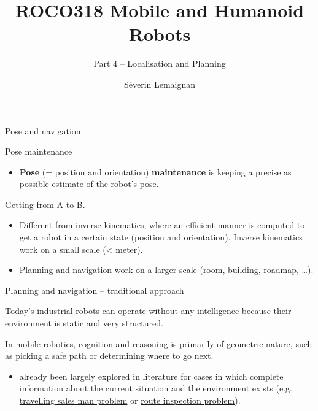 \documentclass[compress]{beamer}
\title{ROCO318 \newline Mobile and Humanoid Robots}
\subtitle{Part 4 -- Localisation and Planning}
\date{}
\author{Séverin Lemaignan}
\institute{Centre for Neural Systems and Robotics\\{\bf Plymouth University}}
\begin{document}

\maketitle

\begin{frame}{Pose and navigation}

Pose maintenance

\begin{itemize}
\item \textbf{Pose} (= position and orientation) \textbf{maintenance} is
  keeping a precise as possible estimate of the robot's pose.
\end{itemize}

Getting from A to B.

\begin{itemize}
\item Different from inverse kinematics, where an efficient manner is
  computed to get a robot in a certain state (position and orientation).
  Inverse kinematics work on a small scale (\textless{} meter).
\item Planning and navigation work on a larger scale (room, building,
  roadmap, \ldots{}).
\end{itemize}

\end{frame}

\begin{frame}{Planning and navigation -- traditional approach}

Today's industrial robots can operate without any intelligence because
their environment is static and very structured.

In mobile robotics, cognition and reasoning is primarily of geometric
nature, such as picking a safe path or determining where to go next.

\begin{itemize}
\item already been largely explored in literature for cases in which
  complete information about the current situation and the environment
  exists (e.g.
  \href{http://en.wikipedia.org/wiki/Travelling_salesman_problem}{travelling
  sales man problem} or
  \href{http://en.wikipedia.org/wiki/Route_inspection_problem}{route
  inspection problem}).
\end{itemize}

\end{frame}
\end{document}
